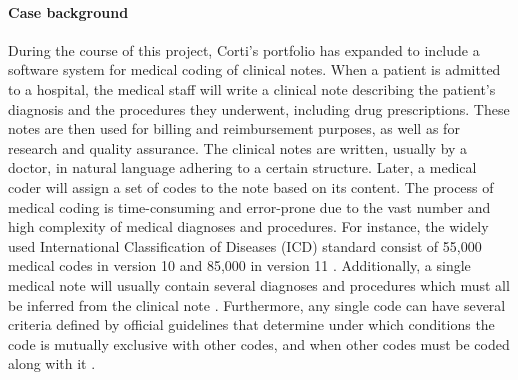 \paragraph{Case background} During the course of this project, Corti's portfolio has expanded to include a software system for medical coding of clinical notes. 
When a patient is admitted to a hospital, the medical staff will write a clinical note describing the patient's diagnosis and the procedures they underwent, including drug prescriptions. 
These notes are then used for billing and reimbursement purposes, as well as for research and quality assurance. 
The clinical notes are written, usually by a doctor, in natural language adhering to a certain structure. Later, a medical coder will assign a set of codes to the note based on its content. 
The process of medical coding is time-consuming and error-prone due to the vast number and high complexity of medical diagnoses and procedures. For instance, the widely used International Classification of Diseases (ICD) standard consist of 55,000 medical codes in version 10 and 85,000 in version 11 \parencite{worldhealthorganisationwho_international_2023}. Additionally, a single medical note will usually contain several diagnoses and procedures which must all be inferred from the clinical note \parencite{johnsonMIMICIIIFreelyAccessible2016,johnsonMIMICIVFreelyAccessible2023}. 
Furthermore, any single code can have several criteria defined by official guidelines that determine under which conditions the code is mutually exclusive with other codes, and when other codes must be coded along with it \parencite{centersformedicaremedicaidservicesus_icd10cm_2023}. 

